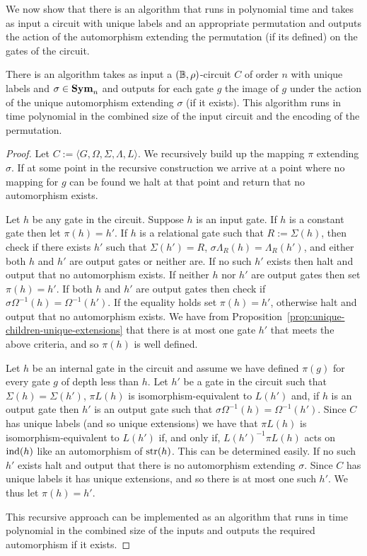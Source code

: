 \documentclass[../paper.tex]{subfiles}
\begin{document}
We now show that there is an algorithm that runs in polynomial time and takes as
input a circuit with unique labels and an appropriate permutation and outputs
the action of the automorphism extending the permutation (if its defined) on the
gates of the circuit.

\begin{lem}
  There is an algorithm takes as input a $(\mathbb{B}, \rho)$-circuit $C$ of order $n$
  with unique labels and $\sigma \in \text{\textbf{Sym}}_n$ and outputs for each gate $g$ the
  image of $g$ under the action of the unique automorphism extending $\sigma$
  (if it exists). This algorithm runs in time polynomial in the combined size of
  the input circuit and the encoding of the permutation.
  \label{lem:compute-automorphisms}
\end{lem}
\begin{proof}
  Let $C := \langle G, \Omega, \Sigma, \Lambda, L \rangle$. We recursively build
  up the mapping $\pi$ extending $\sigma$. If at some point in the recursive
  construction we arrive at a point where no mapping for $g$ can be found we
  halt at that point and return that no automorphism exists.

  Let $h$ be any gate in the circuit. Suppose $h$ is an input gate. If $h$ is a
  constant gate then let $\pi (h) = h'$. If $h$ is a relational gate such that
  $R := \Sigma(h)$, then check if there exists $h'$ such that $\Sigma (h') = R$,
  $\sigma \Lambda_R(h) = \Lambda_R(h')$, and either both $h$ and $h'$ are output
  gates or neither are. If no such $h'$ exists then halt and output that no
  automorphism exists. If neither $h$ nor $h'$ are output gates then set $\pi
  (h) = h'$. If both $h$ and $h'$ are output gates then check if $\sigma
  \Omega^{-1}(h) = \Omega^{-1}(h')$. If the equality holds set $\pi(h) = h'$,
  otherwise halt and output that no automorphism exists. We have from
  Proposition~\ref{prop:unique-children-unique-extensions} that there is at most
  one gate $h'$ that meets the above criteria, and so $\pi(h)$ is well defined.

  Let $h$ be an internal gate in the circuit and assume we have defined $\pi
  (g)$ for every gate $g$ of depth less than $h$. Let $h'$ be a gate in the
  circuit such that $\Sigma(h) = \Sigma (h')$, $\pi L(h)$ is
  isomorphism-equivalent to $L(h')$ and, if $h$ is an output gate then $h'$ is
  an output gate such that $\sigma \Omega^{-1}(h) = \Omega^{-1}(h')$. Since $C$
  has unique labels (and so unique extensions) we have that $\pi L(h)$ is
  isomorphism-equivalent to $L(h')$ if, and only if, $L(h')^{-1}\pi L(h)$ acts
  on $\text{\upshape ind}(h)$ like an automorphism of $\text{str}(h)$. This can be determined easily.
  If no such $h'$ exists halt and output that there is no automorphism extending
  $\sigma$. Since $C$ has unique labels it has unique extensions, and so there
  is at most one such $h'$. We thus let $\pi (h) = h'$.

  This recursive approach can be implemented as an algorithm that runs in time
  polynomial in the combined size of the inputs and outputs the required
  automorphism if it exists.
\end{proof}
\end{document}
